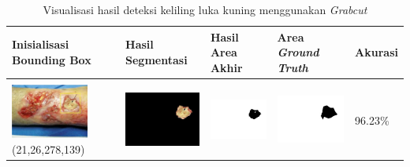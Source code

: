 \begin{table}[H]
	\centering
	\caption{Visualisasi hasil deteksi keliling luka kuning menggunakan \emph{Grabcut}}
	\label{tabel_hasil_6}
	\begin{tabular}{|m{1.0in}|m{1.0in}|m{1.0in}|m{1.0in}|m{0.6in}|}
		\hline
		\textbf{Inisialisasi Bounding Box} & \textbf{Hasil Segmentasi} & \textbf{Hasil Area Akhir} & \textbf{Area \emph{Ground Truth}} & \textbf{Akurasi} \\
		\hline
		
		&  &  & \\
		\includegraphics[width=1.0in]{gambar/hasil_segmentasi/luka_kuning/image_13_rect.jpg} {\centering\fontsize{10}{10}\selectfont(21,26,278,139)}&
		\includegraphics[width=1.0in]{gambar/hasil_segmentasi/luka_kuning/result_13.jpg}&
		\includegraphics[width=1.0in]{gambar/hasil_segmentasi/luka_kuning/mask_r_13.jpg}&
		\includegraphics[width=1.0in]{gambar/hasil_segmentasi/luka_kuning/13_r.jpg}&
		96.23\% \\
		\hline


\end{tabular}
\end{table}
